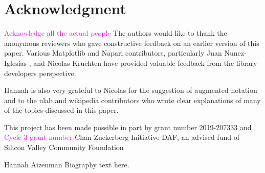 \documentclass[journal]{IEEEtran}
\newcommand{\note}[1]{\textcolor{magenta}{#1}}
\theoremstyle{definition}
\theoremstyle{remark}
\begin{document}
\section*{Acknowledgment}
\note{Acknowledge all the actual people}
The authors would like to thank the anonymous reviewers who gave constructive feedback on
an earlier version of this paper. Various Matplotlib and Napari contributors, particularly
Juan Nunez-Iglesias , and Nicolas Kruchten have provided valuable feedback from the
library developers perspective.

Hannah is also very grateful to Nicolas for the suggestion of augmented notation and to
the nlab and wikipedia contributors who wrote clear explanations of many of the topics
discussed in this paper.

This project has been made possible in part by grant number 2019-207333 and \note{Cycle 3 grant number} Chan Zuckerberg Initiative DAF, an advised fund of Silicon Valley Community Foundation


\ifCLASSOPTIONcaptionsoff
  \newpage
\fi



\printbibliography



\begin{IEEEbiographynophoto}{Hannah Aizenman}
Biography text here.
\end{IEEEbiographynophoto}
\end{document}
